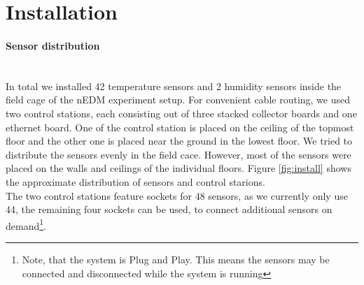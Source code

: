 \documentclass[a4paper]{scrreprt}
\begin{document}
\section{Installation}
\paragraph{Sensor distribution}\hspace{1cm}\\
In total we installed 42 temperature sensors and 2 humidity sensors inside the field
cage of the nEDM experiment setup. For convenient cable routing, we used
two control stations, each consisting out of three stacked collector boards and one
ethernet board. One of the control station is placed on the ceiling of the
topmost floor and the other one is placed near the ground in the lowest floor. We tried
to distribute the sensors evenly in the field cace. However, most
of the sensors were placed on the walls and ceilings of the individual floors. Figure
\ref{fig:install} shows the approximate distribution of sensors and control starions.\\
The two control stations feature sockets for 48 sensors, as we currently only use 44,
the remaining four sockets can be used, to connect additional sensors on demand\footnote{Note, that
the system is Plug and Play. This means the sensors may be connected and disconnected
while the system is running}.\\
\end{document}
